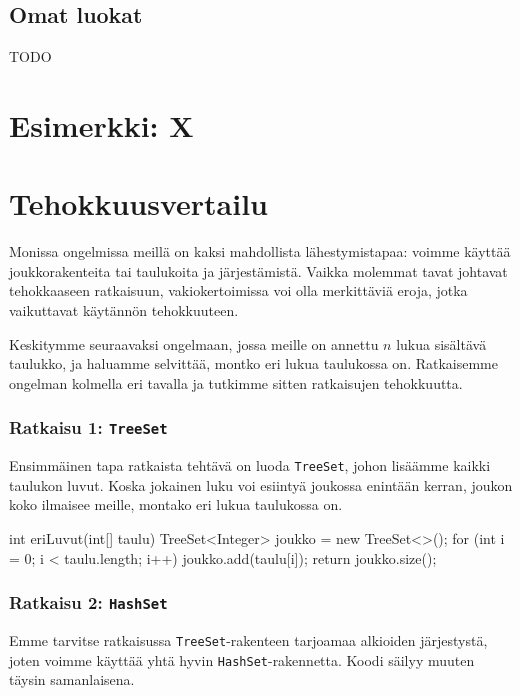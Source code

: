 \subsection{Omat luokat}

TODO

\section{Esimerkki: X}

\section{Tehokkuusvertailu}

Monissa ongelmissa meillä on kaksi mahdollista lähestymistapaa:
voimme käyttää joukkorakenteita tai taulukoita ja järjestämistä.
Vaikka molemmat tavat johtavat tehokkaaseen ratkaisuun,
vakiokertoimissa voi olla merkittäviä eroja, jotka vaikuttavat
käytännön tehokkuuteen.

Keskitymme seuraavaksi ongelmaan, jossa meille on annettu
$n$ lukua sisältävä taulukko, ja haluamme selvittää,
montko eri lukua taulukossa on.
Ratkaisemme ongelman kolmella eri tavalla ja tutkimme sitten
ratkaisujen tehokkuutta.

\subsubsection{Ratkaisu 1: \texttt{TreeSet}}

Ensimmäinen tapa ratkaista tehtävä on luoda \texttt{TreeSet},
johon lisäämme kaikki taulukon luvut.
Koska jokainen luku voi esiintyä joukossa enintään kerran,
joukon koko ilmaisee meille, montako eri lukua taulukossa on.

\begin{code}
int eriLuvut(int[] taulu) {
    TreeSet<Integer> joukko = new TreeSet<>();
    for (int i = 0; i < taulu.length; i++) {
        joukko.add(taulu[i]);
    }
    return joukko.size();
}
\end{code}

\subsubsection{Ratkaisu 2: \texttt{HashSet}}

Emme tarvitse ratkaisussa \texttt{TreeSet}-rakenteen
tarjoamaa alkioiden järjestystä, joten voimme käyttää
yhtä hyvin \texttt{HashSet}-rakennetta.
Koodi säilyy muuten täysin samanlaisena.

